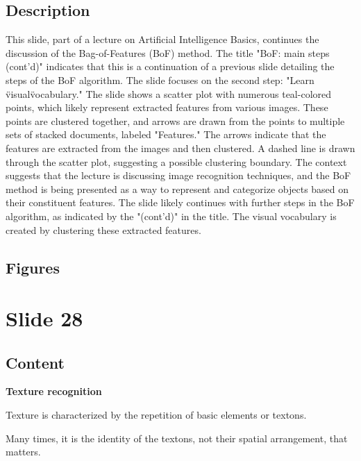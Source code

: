 \documentclass{article}%
\begin{document}
\subsection{Description}%
This slide, part of a lecture on Artificial Intelligence Basics, continues the discussion of the Bag-of-Features (BoF) method.  The title "BoF: main steps (cont'd)" indicates that this is a continuation of a previous slide detailing the steps of the BoF algorithm.  The slide focuses on the second step: "Learn \"visual\" vocabulary."  The slide shows a scatter plot with numerous teal-colored points, which likely represent extracted features from various images.  These points are clustered together, and arrows are drawn from the points to multiple sets of stacked documents, labeled "Features."  The arrows indicate that the features are extracted from the images and then clustered.  A dashed line is drawn through the scatter plot, suggesting a possible clustering boundary.  The context suggests that the lecture is discussing image recognition techniques, and the BoF method is being presented as a way to represent and categorize objects based on their constituent features.  The slide likely continues with further steps in the BoF algorithm, as indicated by the "(cont'd)" in the title.  The visual vocabulary is created by clustering these extracted features.%
\subsection{Figures}%
\begin{figure}[H]%
\centering%
\end{figure}

%
\newpage%
\section{Slide 28}%
\label{sec:Slide28}%
\subsection{Content}%

\textbf{Texture recognition}

Texture is characterized by the repetition of basic elements or textons.

Many times, it is the identity of the textons, not their spatial arrangement, that matters.
%
\end{document}
